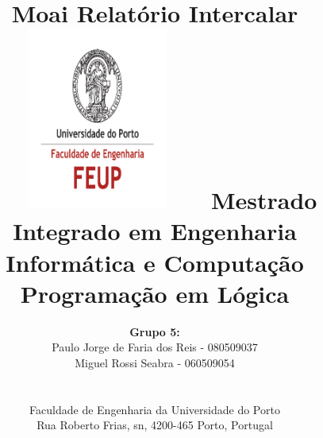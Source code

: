 \documentclass[15pt,a4paper]{article}
\begin{document}
\setlength{\textwidth}{16cm}
\setlength{\textheight}{22cm}

\title{\Huge\textbf{Moai}\linebreak\linebreak\linebreak
\Large\textbf{Relatório Intercalar}\linebreak\linebreak
\includegraphics[height=6cm, width=7cm]{feup.pdf}\linebreak \linebreak
\Large{Mestrado Integrado em Engenharia Informática e Computação} \linebreak \linebreak
\Large{Programação em Lógica}\linebreak
}

\author{\textbf{Grupo 5:}\\ Paulo Jorge de Faria dos Reis - 080509037 \\ Miguel Rossi Seabra - 060509054 \\\linebreak\linebreak \\
 \\ Faculdade de Engenharia da Universidade do Porto \\ Rua Roberto Frias, s\/n, 4200-465 Porto, Portugal \linebreak\linebreak\linebreak
\linebreak\linebreak\vspace{1cm}}
\maketitle
\thispagestyle{empty}

\end{document}
